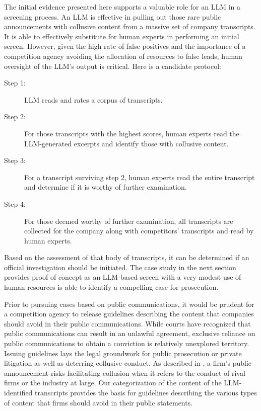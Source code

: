     The initial evidence presented here supports 
    a valuable role for an LLM in a screening process. An LLM is effective in 
    pulling out those rare public announcements with collusive content from a 
    massive set of company transcripts. It is able to effectively substitute 
    for human experts in performing an initial screen. However, given the 
    high rate of false positives and the importance of a competition agency avoiding 
    the allocation of resources to false leads, human oversight of the LLM's 
    output is critical. Here is a candidate protocol:
    \begin{description}
     \item[Step 1:] LLM reads and rates a corpus of transcripts.
     \item[Step 2:] For those transcripts with the highest scores, human experts read the LLM-generated excerpts and identify those with collusive content.
     \item[Step 3:] For a transcript surviving step 2, human experts read the entire transcript and determine if it is worthy of further examination.
     \item[Step 4:] For those deemed worthy of further examination, all transcripts are collected for the company along with competitors' transcripts and read by human experts.
    \end{description}
    \noindent Based on the assessment of that body of transcripts, 
    it can be determined if an official investigation should be 
    initiated. The case study in the next section provides proof 
    of concept as an LLM-based screen with a very modest use of 
    human resources is able to identify a compelling case for 
    prosecution.

    Prior to pursuing cases based on public communications, it would 
    be prudent for a competition agency to release guidelines describing 
    the content that companies should avoid in their public communications. 
    While courts have recognized that public communications can result in 
    an unlawful agreement, exclusive reliance on public communications to 
    obtain a conviction is relatively unexplored territory. Issuing 
    guidelines lays the legal groundwork for public prosecution or private 
    litigation as well as deterring collusive conduct. As described in
     \textcite{harrington2022collusion}, a firm's public announcement 
     risks facilitating collusion when it refers to the conduct of rival 
     firms or the industry at large. Our categorization of the content of 
     the LLM-identified transcripts provides the basis for guidelines 
    describing the various types of content that firms should avoid 
    in their public statements.